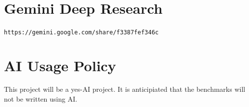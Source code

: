 \documentclass[sigconf]{acmart}
\begin{document}



\appendix
\section{Gemini Deep Research}
\texttt{https://gemini.google.com/share/f3387fef346c}

\section{AI Usage Policy}
This project will be a yes-AI project. It is anticipiated that the benchmarks will not be written using AI.
\end{document}
